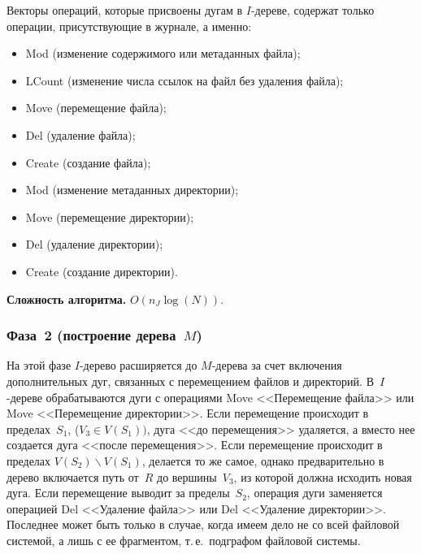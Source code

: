 \begin{multicols}{2}
Векторы операций, которые присвоены дугам в $I$-дереве, содержат только 
операции, при\-сут\-ст\-ву\-ющие в журнале, а именно:
\begin{itemize}
\item Mod (изменение содержимого или метаданных файла);\\[-15pt]
\item  LCount (изменение числа ссылок на файл без удаления файла);\\[-15pt]
\item  Move (перемещение файла);\\[-15pt]
\item  Del (удаление файла);\\[-15pt]
\item  Create (создание файла);\\[-15pt]
\item  Mod (изменение метаданных директории);\\[-15pt]
\item  Move (перемещение директории);\\[-15pt]
\item  Del (удаление директории);\\[-15pt]
\item  Create (создание директории).
\end{itemize}

      \smallskip

      \noindent
      \textbf{Сложность алгоритма.} $O(n_J \log (N))$.

\subsubsection{Фаза~2 (построение дерева~$M$)} %

      На этой фазе $I$-дерево расширяется до $M$-дерева за счет включения 
дополнительных дуг, связанных с перемещением файлов и директорий. 
      В~$I$-дереве\linebreak
      обрабатываются дуги с операциями Move <<Перемещение 
файла>> или Move <<Перемещение директории>>. Если перемещение 
происходит в пределах~$S_1$, ($V_3\in V(S_1))$, дуга <<до перемещения>>\linebreak 
удаляется, а вместо нее создается дуга <<после перемещения>>. Если 
перемещение происходит в пределах $V(S_2)\backslash V(S_1)$, делается то же 
самое, однако предварительно в дерево включается путь от~$R$ до 
вершины~$V_3$, из которой должна исходить новая дуга. Если перемещение 
выводит за пределы~$S_2$, операция дуги заменяется операцией Del 
<<Удаление файла>> или Del <<Удаление директории>>. Последнее может 
быть только в случае, когда имеем дело не со всей файловой системой, а лишь с 
ее фрагментом, т.\,е.\ подграфом файловой системы.
      

\end{multicols}
